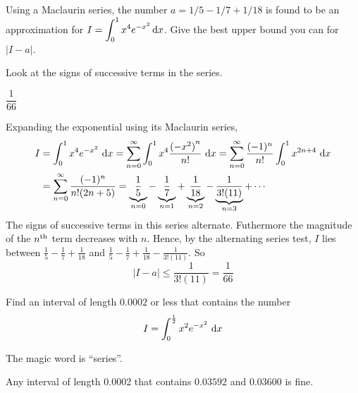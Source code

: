 \begin{question}[2012A]
Using a Maclaurin series, the number $a = 1/5-1/7+1/18$ is found to be an approximation for $\displaystyle I = \int_0^1 x^4 e^{-x^2}\,\mathrm{d}x$. Give the best
upper bound you can for $|I - a|$.
\end{question}

\begin{hint}
Look at the signs of successive terms in the series.
\end{hint}

\begin{answer}
$\dfrac{1}{66}$
\end{answer}

\begin{solution}
Expanding the exponential using its Maclaurin series,
\begin{align*}
I&=\int_0^1 x^4 e^{-x^2}\ \mathrm{d}x
=\sum_{n=0}^\infty\int_0^1 x^4 \frac{{(-x^2)}^n}{n!}\ \mathrm{d}x
=\sum_{n=0}^\infty \frac{(-1)^n}{n!}\int_0^1 x^{2n+4} \ \mathrm{d}x \\
&=\sum_{n=0}^\infty \frac{(-1)^n}{n!(2n+5)}
= \underbrace{\frac{1}{5}}_{n=0}
   -\underbrace{\frac{1}{7}}_{n=1}
   +\underbrace{\frac{1}{18}}_{n=2}
   -\underbrace{\frac{1}{3!(11)}}_{n=3}
   +\cdots
\end{align*}
The signs of successive terms in this series alternate. Futhermore the
magnitude of the $n^{\rm th}$ term decreases with $n$. Hence, by the alternating
series test, $I$ lies between
$\frac{1}{5}-\frac{1}{7}+\frac{1}{18}$ and
$\frac{1}{5}-\frac{1}{7}+\frac{1}{18}-\frac{1}{3!(11)}$.
So
\begin{equation*}
|I - a| \le \frac{1}{3!(11)} =\frac{1}{66}
\end{equation*}

\end{solution}



\begin{question}[M121 1999A]
Find an interval of length $0.0002$ or less that contains
the number
\begin{equation*}
I=\int_0^{\frac{1}{2}} x^2 e^{-x^2}\ \dee{x}
\end{equation*}
\end{question}

\begin{hint}
The magic word is ``series''.
\end{hint}

\begin{answer}
Any interval of length 0.0002 that contains $0.03592$ and $0.03600$
is fine.
\end{answer}

